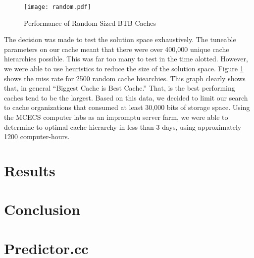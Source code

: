 \documentclass[twocolumn]{article}
\newcommand{\centerimage}[3]{
\begin{figure}[ht!]  
\begin{center} #1
\caption{#2}
\label{#3}
\end{center}
\end{figure}}
\begin{document}
\centerimage{\texttt{[image: random.pdf]}}{Performance
  of Random Sized BTB Caches}{bgraph}

The decision was made to test the solution space exhaustively. The
tuneable parameters on our cache meant that there were over 400,000
unique cache hierarchies possible. This was far too many to test in
the time alotted. However, we were able to use heuristics to reduce
the size of the solution space. Figure \ref{bgraph} shows the miss
rate for 2500 random cache hiearchies. This graph clearly shows that,
in general ``Biggest Cache is Best Cache.'' That, is the best
performing caches tend to be the largest. Based on this data, we
decided to limit our search to cache organizations that consumed at
least 30,000 bits of storage space. Using the MCECS computer labs as
an impromptu server farm, we were able to determine to optimal cache
hierarchy in less than 3 days, using approximately 1200
computer-hours. 

\section{Results}
\section{Conclusion}
\newpage
\onecolumn
\section{Predictor.cc}

\end{document}
